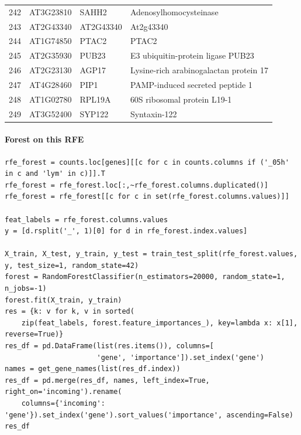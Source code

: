 \documentclass[11pt]{article}
\begin{document}
\begin{center}
\begin{tabular}{rlll}
242 & AT3G23810 & SAHH2 & Adenosylhomocysteinase\\
243 & AT2G43340 & AT2G43340 & At2g43340\\
244 & AT1G74850 & PTAC2 & PTAC2\\
245 & AT2G35930 & PUB23 & E3 ubiquitin-protein ligase PUB23\\
246 & AT2G23130 & AGP17 & Lysine-rich arabinogalactan protein 17\\
247 & AT4G28460 & PIP1 & PAMP-induced secreted peptide 1\\
248 & AT1G02780 & RPL19A & 60S ribosomal protein L19-1\\
249 & AT3G52400 & SYP122 & Syntaxin-122\\
\end{tabular}
\end{center}


\paragraph{Forest on this RFE}
\label{sec:org714e927}

\begin{verbatim}
rfe_forest = counts.loc[genes][[c for c in counts.columns if ('_05h' in c and 'lym' in c)]].T
rfe_forest = rfe_forest.loc[:,~rfe_forest.columns.duplicated()]
rfe_forest = rfe_forest[[c for c in set(rfe_forest.columns.values)]]

feat_labels = rfe_forest.columns.values
y = [d.rsplit('_', 1)[0] for d in rfe_forest.index.values]

X_train, X_test, y_train, y_test = train_test_split(rfe_forest.values, y, test_size=1, random_state=42)
forest = RandomForestClassifier(n_estimators=20000, random_state=1, n_jobs=-1)
forest.fit(X_train, y_train)
res = {k: v for k, v in sorted(
    zip(feat_labels, forest.feature_importances_), key=lambda x: x[1], reverse=True)}
res_df = pd.DataFrame(list(res.items()), columns=[
                      'gene', 'importance']).set_index('gene')
names = get_gene_names(list(res_df.index))
res_df = pd.merge(res_df, names, left_index=True, right_on='incoming').rename(
    columns={'incoming': 'gene'}).set_index('gene').sort_values('importance', ascending=False)
res_df
\end{verbatim}
\end{document}
